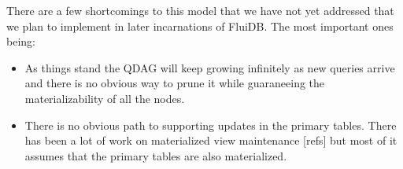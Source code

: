 There are a few shortcomings to this model that we have not yet
addressed that we plan to implement in later incarnations of
FluiDB. The most important ones being:

\begin{itemize}
\item As things stand the QDAG will keep growing infinitely as new queries
  arrive and there is no obvious way to prune it while guaraneeing the
  materializability of all the nodes.
\item There is no obvious path to supporting updates in the primary
  tables. There has been a lot of work on materialized view
  maintenance [refs] but most of it assumes that the primary tables
  are also materialized.
\end{itemize}

